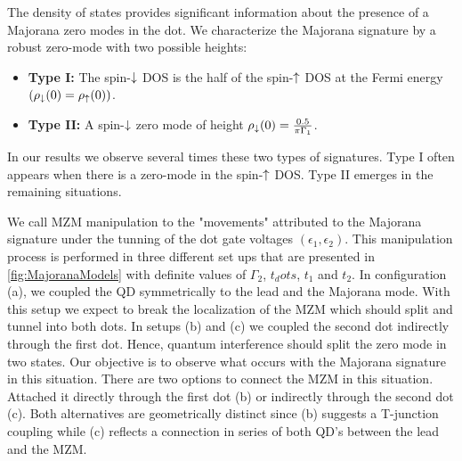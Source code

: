 The density of states provides significant information about the presence of a Majorana zero modes in the dot. We characterize the Majorana signature by a robust zero-mode with two possible heights:
 \begin{itemize}
         \item \textbf{Type I: }  The spin-$\downarrow$ DOS is the half of the spin-$\uparrow$ DOS  at the Fermi energy $(\rho_\downarrow(0)=\rho_\uparrow(0))$. 
         \item \textbf{Type II: } A spin-$\downarrow$ zero mode of height $ \rho_\downarrow(0) = \frac{0.5}{\pi  \Gamma_1}$. 
     \end{itemize}
In our results we observe several times these two types of signatures. Type I often appears when there is a zero-mode in the spin-$\uparrow$ DOS. Type II emerges in the remaining situations. 

We call MZM manipulation to the "movements" attributed to the Majorana signature under the tunning of the dot gate voltages $( \epsilon_1 , \epsilon_2 )$. This manipulation process is performed in three different set ups that are presented in \ref{fig:MajoranaModels} with definite values of $\Gamma_2$, $t_dots$, $t_1$ and $t_2$. In configuration (a), we coupled the QD symmetrically to the lead and the Majorana mode. With this setup we expect to break the localization of the MZM which should split and tunnel into both dots. In setups (b) and (c) we coupled the second dot indirectly through the first dot. Hence, quantum  interference should split the zero mode in two states. Our objective is to observe what occurs with the Majorana signature in this situation. There are two options to connect the MZM in this situation. Attached it directly through the first dot (b) or indirectly through the second dot (c). Both alternatives are geometrically distinct since (b) suggests a T-junction coupling while (c) reflects a connection  in series of both QD's between the lead and the MZM. 


